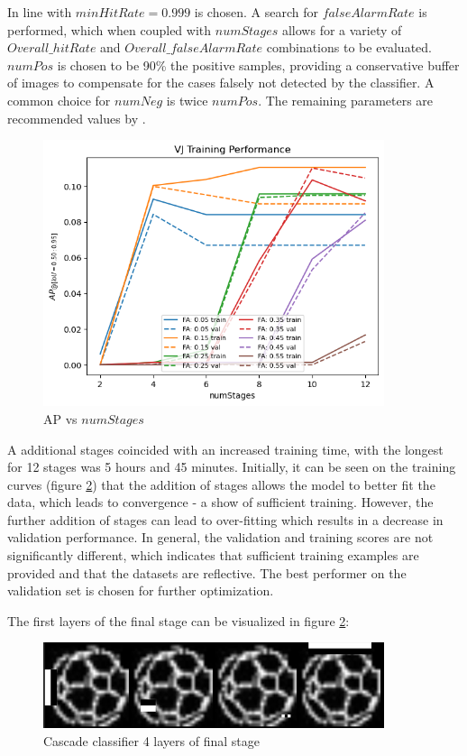 \documentclass[a4paper,twoside,12pt]{report}
\begin{document}
In line with \cite{robovj} $minHitRate = 0.999$ is chosen. A search for $falseAlarmRate$ is performed, which when coupled with $numStages$ allows for a variety of $Overall\_hitRate$ and $Overall\_falseAlarmRate$ combinations to be evaluated. $numPos$ is chosen to be 90\% the positive samples, providing a conservative buffer of images to compensate for the cases falsely not detected by the classifier. A common choice for $numNeg$ is twice $numPos$. The remaining parameters are recommended values by \cite{vjdataset}. 

\begin{figure}[h!]
\begin{center}
\includegraphics[width=10cm]{images/vj_training.png}
\caption{AP vs $numStages$}
\label{fig:vjstages}
\end{center}
\end{figure}

A additional stages coincided with an increased training time, with the longest for 12 stages was 5 hours and 45 minutes. Initially, it can be seen on the training curves (figure \ref{fig:vjstages}) that the addition of stages allows the model to better fit the data, which leads to convergence - a show of sufficient training. However, the further addition of stages can lead to over-fitting which results in a decrease in validation performance. In general, the validation and training scores are not significantly different, which indicates that sufficient training examples are provided and that the datasets are reflective. The best performer on the validation set is chosen for further optimization.

The first layers of the final stage can be visualized in figure \ref{fig:vjstages}:

\begin{figure}[h!]
\begin{center}
\includegraphics[width=10cm]{images/vj_result.jpg}
\caption{Cascade classifier 4 layers of final stage}
\label{fig:vjstages}
\end{center}
\end{figure}
\end{document}
